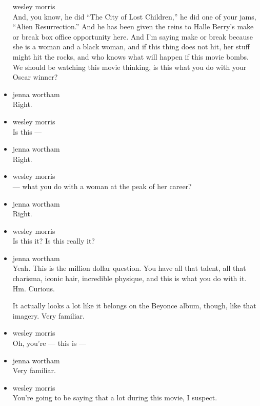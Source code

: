 \begin{itemize}
  wesley morris\\
  And, you know, he did ``The City of Lost Children,'' he did one of
  your jams, ``Alien Resurrection.'' And he has been given the reins to
  Halle Berry's make or break box office opportunity here. And I'm
  saying make or break because she is a woman and a black woman, and if
  this thing does not hit, her stuff might hit the rocks, and who knows
  what will happen if this movie bombs. We should be watching this movie
  thinking, is this what you do with your Oscar winner?
\item
  jenna wortham\\
  Right.
\item
  wesley morris\\
  Is this ---
\item
  jenna wortham\\
  Right.
\item
  wesley morris\\
  --- what you do with a woman at the peak of her career?
\item
  jenna wortham\\
  Right.
\item
  wesley morris\\
  Is this it? Is this really it?
\item
  jenna wortham\\
  Yeah. This is the million dollar question. You have all that talent,
  all that charisma, iconic hair, incredible physique, and this is what
  you do with it. Hm. Curious.

  It actually looks a lot like it belongs on the Beyonce album, though,
  like that imagery. Very familiar.
\item
  wesley morris\\
  Oh, you're --- this is ---
\item
  jenna wortham\\
  Very familiar.
\item
  wesley morris\\
  You're going to be saying that a lot during this movie, I suspect.


\end{itemize}
